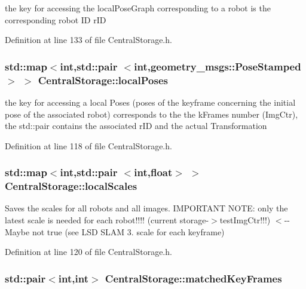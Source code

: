 the key for accessing the local\-Pose\-Graph corresponding to a robot is the corresponding robot \-I\-D r\-I\-D 



\-Definition at line 133 of file \-Central\-Storage.\-h.

\hypertarget{classCentralStorage_a9f86101c4abfa538b14ecafbbffb49e8}{
\subsubsection[{local\-Poses}]{\setlength{\rightskip}{0pt plus 5cm}std\-::map$<$int,std\-::pair $<$int,geometry\-\_\-msgs\-::\-Pose\-Stamped$>$ $>$ {\bf \-Central\-Storage\-::local\-Poses}}}\label{classCentralStorage_a9f86101c4abfa538b14ecafbbffb49e8}
the key for accessing a local \-Poses (poses of the keyframe concerning the initial pose of the associated robot) corresponds to the the k\-Frames number (\-Img\-Ctr), the std\-::pair contains the associated r\-I\-D and the actual \-Transformation 

\-Definition at line 118 of file \-Central\-Storage.\-h.

\hypertarget{classCentralStorage_a77f707a32dbf4d3b76668d2bdb2db060}{
\subsubsection[{local\-Scales}]{\setlength{\rightskip}{0pt plus 5cm}std\-::map$<$int,std\-::pair $<$int,float$>$ $>$ {\bf \-Central\-Storage\-::local\-Scales}}}\label{classCentralStorage_a77f707a32dbf4d3b76668d2bdb2db060}


\-Saves the scales for all robots and all images. \-I\-M\-P\-O\-R\-T\-A\-N\-T \-N\-O\-T\-E\-: only the latest scale is needed for each robot!!!! (current storage-\/$>$test\-Img\-Ctr!!!) $<$-\/-\/ \-Maybe not true (see \-L\-S\-D \-S\-L\-A\-M 3. scale for each keyframe) 



\-Definition at line 120 of file \-Central\-Storage.\-h.

\hypertarget{classCentralStorage_a393e5d052d921122176d0ebf0a6cfadb}{
\subsubsection[{matched\-Key\-Frames}]{\setlength{\rightskip}{0pt plus 5cm}std\-::pair$<$int,int$>$ {\bf \-Central\-Storage\-::matched\-Key\-Frames}}}\label{classCentralStorage_a393e5d052d921122176d0ebf0a6cfadb}


